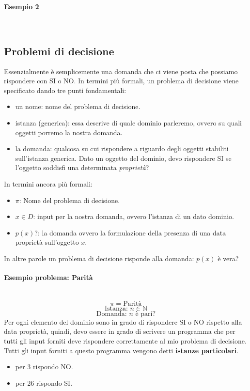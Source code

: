 \documentclass{article}
\begin{document}
\paragraph{Esempio 2}\mbox{}\\

\subsection{Problemi di decisione}
Essenzialmente è semplicemente una domanda che ci viene posta che possiamo rispondere con SI o NO. In termini
più formali, un problema di decisione viene specificato dando tre punti fondamentali:
\begin{itemize}
    \item un nome: nome del problema di decisione.
    \item istanza (generica): essa descrive di quale dominio parleremo, ovvero su quali oggetti porremo la nostra
          domanda.
    \item la domanda: qualcosa su cui rispondere a riguardo degli oggetti stabiliti sull'istanza generica. Dato
          un oggetto del dominio, devo rispondere SI se l'oggetto soddisfi una determinata \textit{proprietà}?
\end{itemize}
In termini ancora più formali:
\begin{itemize}
    \item $\pi$: Nome del problema di decisione.
    \item $x\in D$: input per la nostra domanda, ovvero l'istanza di un dato dominio.
    \item $p(x)?$: la domanda ovvero la formulazione della presenza di una data proprietà sull'oggetto $x$.
\end{itemize}
In altre parole un problema di decisione risponde alla domanda: $p(x)$ è vera?

\paragraph{Esempio problema: Parità}\mbox{}\\
$$\pi=\text{Parità}$$
$$\text{Istanza: }n\in\mathbb{N}$$
$$\text{Domanda: }n \text{ è pari?}$$
Per ogni elemento del dominio sono in grado di rispondere SI o NO rispetto alla data proprietà, quindi,
devo essere in grado di scrivere un programma che per tutti gli input forniti deve rispondere correttamente
al mio problema di decisione.
Tutti gli input forniti a questo programma vengono detti \textbf{istanze particolari}.
\begin{itemize}
    \item per 3 rispondo NO.
    \item per 26 rispondo SI.
\end{itemize}
\end{document}
